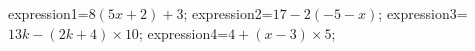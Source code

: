 \documentclass[exercice]{thedocument}%
\begin{document}
%
    \>expression1=$8(5x+2)+3$;%
    \>expression2=$17-2(-5-x)$;%
    \>expression3=$13k-(2k+4)\times10$;%
    \>expression4=$4+(x-3)\times5$;%
\end{document}
